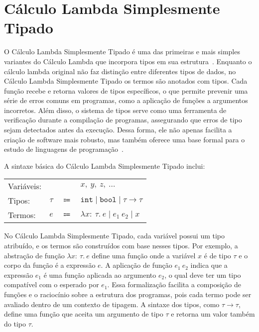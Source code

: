 \section{Cálculo Lambda Simplesmente Tipado}\label{sec:simply-typed-lambda-calculus}

O Cálculo Lambda Simplesmente Tipado é uma das primeiras e mais simples variantes do Cálculo Lambda que incorpora tipos em sua estrutura~\cite{church1940formulation}.
Enquanto o cálculo lambda original não faz distinção entre diferentes tipos de dados, no Cálculo Lambda Simplesmente Tipado os termos são anotados com tipos.
Cada função recebe e retorna valores de tipos específicos, o que permite prevenir uma série de erros comuns em programas, como a aplicação de funções a argumentos incorretos.
Além disso, o sistema de tipos serve como uma ferramenta de verificação durante a compilação de programas, assegurando que erros de tipo sejam detectados antes da execução.
Dessa forma, ele não apenas facilita a criação de software mais robusto, mas também oferece uma base formal para o estudo de linguagens de programação~\cite{pierce2002types}.

A sintaxe básica do Cálculo Lambda Simplesmente Tipado inclui:

\begin{tabular}{lccl}
    Variáveis: &        &             & $x,\ y,\ z,\ \ldots$                                    \\
    Tipos:     & $\tau$ & $\Coloneqq$ & $\mathtt{int} \mid \mathtt{bool} \mid \tau \to \tau$ \\
    Termos:    & $e$    & $\Coloneqq$ & $\lambda x{:}\ \tau.\ e \mid e_1\ e_2 \mid x$        \\
\end{tabular}

\phantom{NewLine}

\noindent
No Cálculo Lambda Simplesmente Tipado, cada variável possui um tipo atribuído, e os termos são construídos com base nesses tipos.
Por exemplo, a abstração de função $\lambda x{:}\ \tau.\ e$ define uma função onde a variável $x$ é de tipo $\tau$ e o corpo da função é a expressão $e$.
A aplicação de função $e_1\ e_2$ indica que a expressão $e_1$ é uma função aplicada ao argumento $e_2$, o qual deve ter um tipo compatível com o esperado por $e_1$.
Essa formalização facilita a composição de funções e o raciocínio sobre a estrutura dos programas, pois cada termo pode ser avaliado dentro de um contexto de tipagem.
A sintaxe dos tipos, como $\tau \to \tau$, define uma função que aceita um argumento de tipo $\tau$ e retorna um valor também do tipo $\tau$.

